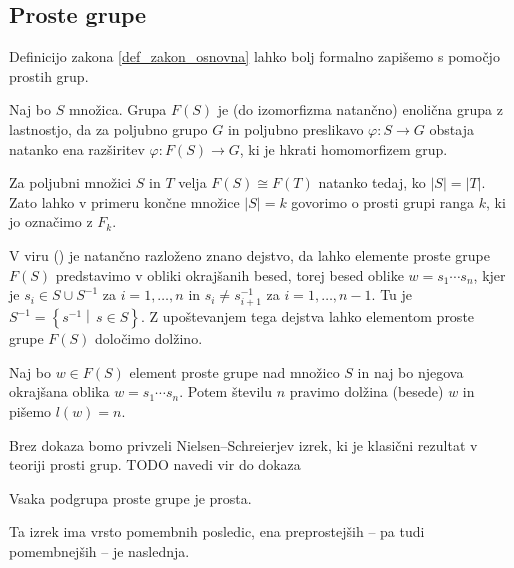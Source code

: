 \documentclass[mat1, tisk]{fmfdelo}
\numberwithin{equation}{section}  %
\begin{document}
\subsection{Proste grupe}

Definicijo zakona \ref{def_zakon_osnovna} lahko bolj formalno zapišemo s pomočjo prostih grup.

\begin{definicija}
\label{def_prosta_grupa}
Naj bo $S$ množica. Grupa $F(S)$ je (do izomorfizma natančno) enolična grupa z lastnostjo, da za poljubno grupo $G$ in poljubno preslikavo
$\varphi: S \to G$ obstaja natanko ena razširitev $\varphi: F(S) \to G$, ki je hkrati homomorfizem grup. 
\end{definicija}

\begin{opomba}
Za poljubni množici $S$ in $T$ velja $F(S) \cong F(T)$ natanko tedaj, ko $\lvert S \rvert = \lvert T \rvert$. Zato lahko v primeru končne množice $\lvert S \rvert = k$ govorimo o 
prosti grupi ranga $k$, ki jo označimo z $F_k$.
\end{opomba}

V viru (\cite[str.~4, tridtev 1.9]{Lyndon_Schupp_2015}) je natančno razloženo znano dejstvo, da lahko elemente proste grupe $F(S)$ predstavimo v obliki okrajšanih besed,
torej besed oblike $w = s_1 \cdots s_n$, kjer je $s_i \in S \cup S^{-1}$ za $i = 1, \ldots, n$ in $s_i \neq s_{i+1}^{-1}$ za $i = 1, \ldots, n-1$. Tu je $S^{-1} = \left\{ s^{-1}  \middle|\, s \in  S \right\}$.
Z upoštevanjem tega dejstva lahko elementom proste grupe $F(S)$ določimo dolžino.

\begin{definicija}
\label{def_dolzina_besede}
Naj bo $w \in  F(S)$ element proste grupe nad množico $S$ in naj bo njegova okrajšana oblika $w = s_1 \cdots s_n$. Potem številu $n$ pravimo dolžina (besede) $w$ in pišemo $l(w) = n$.
\end{definicija}

Brez dokaza bomo privzeli Nielsen--Schreierjev izrek, ki je klasični rezultat v teoriji prosti grup.
TODO navedi vir do dokaza

\begin{izrek}
\label{izr_nielsen_schreier}
 Vsaka podgrupa proste grupe je prosta.
\end{izrek}

Ta izrek ima vrsto pomembnih posledic, ena preprostejših -- pa tudi pomembnejših -- je naslednja. 
\end{document}

